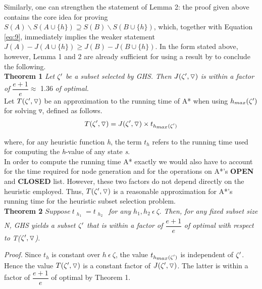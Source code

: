 \documentclass[11pt,a4paper,oneside]{report}
\begin{document}
Similarly, one can strengthen the statement of Lemma 2: the proof given above contains the core idea for proving $S(A)  \backslash S(A \cup \{h\}) \supseteq S(B)  \backslash  S(B \cup \{h\})$, which, together with Equation \ref{eq:9}, immediately implies the weaker statement $J(A) - J(A \cup \{h\}) \geq J(B) - J(B \cup \{h\})$. In the form stated above, however, Lemma 1 and 2 are already sufficient for using a result by \citep{nemhauser1978analysis} to conclude the following.\\

\textbf{Theorem 1} \textit{Let} $\zeta\sp{\prime}$ \textit{be a subset selected by GHS. Then} $J(\zeta\sp{\prime}, \triangledown)$ \textit{is within a factor of} $\dfrac{e+1}{e} \approx $ 1.36 \textit{of optimal.}\\

Let $T(\zeta\sp{\prime}, \triangledown)$ be an approximation to the running time of A* when using $h_{\substack{max}}(\zeta\sp{\prime})$ for solving $\triangledown$, defined as follows.\\

\begin{equation}
\label{eq:10}
T(\zeta\sp{\prime}, \triangledown) = J(\zeta\sp{\prime}, \triangledown) \times t_{\substack{h_{\substack{max}}(\zeta\sp{\prime})}}
\end{equation}

where, for any heuristic function \textit{h}, the term $t_h$ refers to the running time used for computing the \textit{h}-value of any state \textit{s}.\\
In order to compute the running time A* exactly we would also have to account for the time required for node generation and for the operations on A*'s \textbf{OPEN} and \textbf{CLOSED} list. However, these two factors do not depend directly on the heuristic employed. Thus, $T(\zeta\sp{\prime}, \triangledown)$ is a reasonable approximation for A*'s running time  for the heuristic subset selection problem.\\

\textbf{Theorem 2} $ Suppose\ t_{\substack{h_1}} = t_{\substack{h_2}}$\  \textit{for any} $h_1, h_2\  \epsilon\  \zeta$. \textit{Then, for any fixed subset size N, GHS yields a subset $\zeta\sp{\prime}$ that is within a factor of $\dfrac{e+1}{e}$} \textit{of optimal with respect to T($\zeta\sp{\prime}, \triangledown$)}.

\textit{Proof.} Since $t_h$ is constant over $h\  \epsilon\  \zeta$, the value $t_{\substack{h_{\substack{max}}(\zeta\sp{\prime})}}$ is independent  of $\zeta\sp{\prime}$. Hence the value $T(\zeta\sp{\prime}, \triangledown)$ is a constant factor of $J(\zeta\sp{\prime}, \triangledown)$. The latter is within a factor of $\dfrac{e+1}{e}$ of optimal by Theorem 1.\\


%
\end{document}
